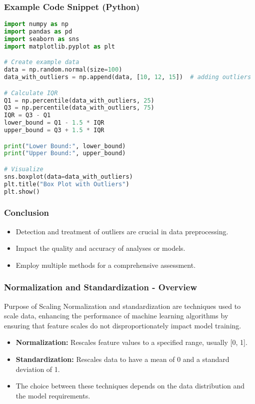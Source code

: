 \documentclass[aspectratio=169]{beamer}
\begin{document}
\begin{frame}[fragile]
    \frametitle{Example Code Snippet (Python)}
    \begin{lstlisting}[language=Python]
import numpy as np
import pandas as pd
import seaborn as sns
import matplotlib.pyplot as plt

# Create example data
data = np.random.normal(size=100)
data_with_outliers = np.append(data, [10, 12, 15])  # adding outliers

# Calculate IQR
Q1 = np.percentile(data_with_outliers, 25)
Q3 = np.percentile(data_with_outliers, 75)
IQR = Q3 - Q1
lower_bound = Q1 - 1.5 * IQR
upper_bound = Q3 + 1.5 * IQR

print("Lower Bound:", lower_bound)
print("Upper Bound:", upper_bound)

# Visualize
sns.boxplot(data=data_with_outliers)
plt.title("Box Plot with Outliers")
plt.show()
    \end{lstlisting}
\end{frame}

\begin{frame}
    \frametitle{Conclusion}
    \begin{itemize}
        \item Detection and treatment of outliers are crucial in data preprocessing.
        \item Impact the quality and accuracy of analyses or models.
        \item Employ multiple methods for a comprehensive assessment.
    \end{itemize}
\end{frame}

\begin{frame}[fragile]
    \frametitle{Normalization and Standardization - Overview}
    \begin{block}{Purpose of Scaling}
        Normalization and standardization are techniques used to scale data, enhancing the performance of machine learning algorithms by ensuring that feature scales do not disproportionately impact model training.
    \end{block}
    \begin{itemize}
        \item \textbf{Normalization:} Rescales feature values to a specified range, usually [0, 1].
        \item \textbf{Standardization:} Rescales data to have a mean of 0 and a standard deviation of 1.
        \item The choice between these techniques depends on the data distribution and the model requirements.
    \end{itemize}
\end{frame}
\end{document}
